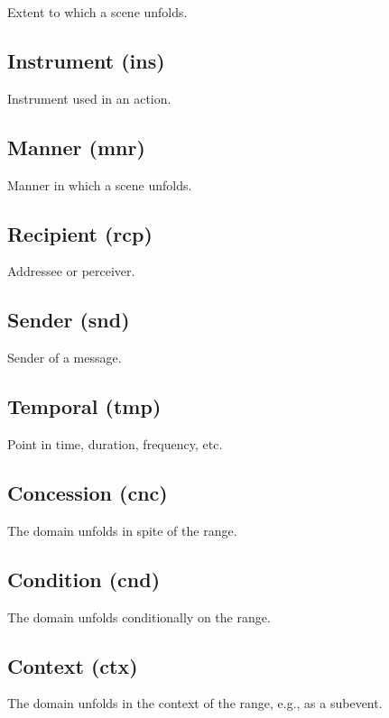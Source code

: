 \documentclass[a4paper]{article}
\begin{document}
Extent to which a scene unfolds.

\subsection{Instrument (ins)}

Instrument used in an action.

\subsection{Manner (mnr)}

Manner in which a scene unfolds.

\subsection{Recipient (rcp)}

Addressee or perceiver.

\subsection{Sender (snd)}

Sender of a message.

\subsection{Temporal (tmp)}

Point in time, duration, frequency, etc.


\subsection{Concession (cnc)}

The domain unfolds in spite of the range.

\subsection{Condition (cnd)}

The domain unfolds conditionally on the range.

\subsection{Context (ctx)}

The domain unfolds in the context of the range, e.g., as a subevent.
\end{document}
